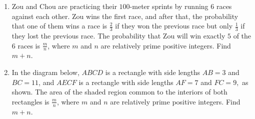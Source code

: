 \documentclass{article}
\begin{document}
\begin{enumerate}[label=\arabic*., itemsep=0.5em]\item Zou and Chou are practicing their \(100\)-meter sprints by running \(6\) races against each other. Zou wins the first race, and after that, the probability that one of them wins a race is \(\frac23\) if they won the previous race but only \(\frac13\) if they lost the previous race. The probability that Zou will win exactly \(5\) of the \(6\) races is \(\frac mn\), where \(m\) and \(n\) are relatively prime positive integers. Find \(m+n\).\par \vspace{0.5em}\item In the diagram below, \(ABCD\) is a rectangle with side lengths \(AB=3\) and \(BC=11\), and \(AECF\) is a rectangle with side lengths \(AF=7\) and \(FC=9,\) as shown. The area of the shaded region common to the interiors of both rectangles is \(\frac mn\), where \(m\) and \(n\) are relatively prime positive integers. Find \(m+n\).



\end{enumerate}
\end{document}
